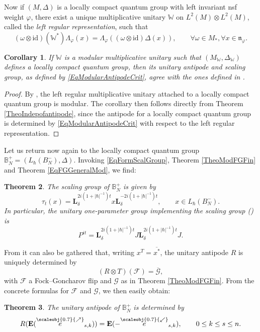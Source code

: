 \documentclass[11pt, reqno]{amsart}
\newtheorem{theorem}{Theorem}[section]
\newtheorem{cor}[theorem]{Corollary}
\theoremstyle{definition}
\numberwithin{equation}{section}
\newcommand{\Fct}{\mathcal{F}}
\newcommand{\tFct}{\mathcal{G}}
\newcommand{\Bor}{B}
\newcommand{\nears}{\scaleobj{0.7}{\nearrow}}
\newcommand{\swars}{\scaleobj{0.7}{\swarrow}}
\newcommand{\nee}{\overset{\nears}{e}}
\newcommand{\swe}{\overset{\swars}{e}}
\newcommand{\id}{\mathrm{id}}
\newcommand{\Eb}{\mathbf{E}}
\newcommand{\Lb}{\mathbf{L}}
\newcommand{\Wbb}{\mathbb{W}}
\newcommand{\mfn}{\mathfrak{n}}
\newcommand{\Bbbb}{\mathbb{B}}
\begin{document}
Now if $(M,\Delta)$ is a locally compact quantum group with left invariant nsf weight $\varphi$, there exist a unique multiplicative unitary $\Wbb$ on $L^2(M)\otimes L^2(M)$, called the \emph{left regular representation}, such that 
\begin{equation}\label{EqLeftRegularMultUnit}
(\omega\otimes \id)(\Wbb^*)\Lambda_{\varphi}(x) = \Lambda_{\varphi}((\omega\otimes \id)\Delta(x)),\qquad \forall \omega \in M_*,\forall x\in \mfn_{\varphi}. 
\end{equation}

\begin{cor}
If $\Wbb$ is a modular multiplicative unitary such that $(M_{\Wbb},\Delta_{\Wbb})$ defines a locally compact quantum group, then its unitary antipode and scaling group, as defined by \eqref{EqModularAntipodeCrit}, agree with the ones defined in \cite{KV03}. 
\end{cor}
\begin{proof}
By \cite[Proposition 6.10]{KV00}, the left regular multiplicative unitary attached to a locally compact quantum group is modular. The corollary then follows directly from Theorem \ref{TheoIndepofantipode}, since the antipode for a locally compact quantum group is determined by \eqref{EqModularAntipodeCrit} with respect to the left regular representation.
\end{proof}

Let us return now again to the locally compact quantum group $\Bbbb_N^+ = (L_{\hbar}(\Bor_N^-),\Delta)$. Invoking \eqref{EqFormScalGroup}, Theorem \ref{TheoModFGFin} and Theorem \ref{EqFGGeneralMod}, we find: 
\begin{theorem} \label{TheoScalGroup}
The scaling group of $\Bbbb_N^+$ is given by 
\begin{equation}
\tau_t(x) = \Lb_{\delta}^{2i(1+|\hbar|^{-1})t}x \Lb_{\delta}^{-2i(1+|\hbar|^{-1})t} ,\qquad x\in L_{\hbar}(\Bor_N^-).
\end{equation}
In particular, the unitary one-parameter group implementing the scaling group (\cite[Definition 6.9]{KV00}) is 
\begin{equation}
P^{it} = \Lb_{\delta}^{2i(1+|\hbar|^{-1})t} J \Lb_{\delta}^{2i(1+|\hbar|^{-1})t} J.
\end{equation}
\end{theorem}

From \cite[Theorem 2.3]{SW01} it can also be gathered that, writing $x^T = \overline{x^*}$, the unitary antipode $R$ is uniquely determined by  
\begin{equation}
(R\otimes T)(\Fct) = \overline{\tFct}, 
\end{equation}
with $\Fct$ a Fock--Goncharov flip and $\tFct$ as in Theorem \ref{TheoModFGFin}. From the concrete formulas for $\Fct$ and $\tFct$, we then easily obtain:
\begin{theorem}
The unitary antipode of $\Bbbb_N^+$ is determined by 
\begin{equation}\label{EqFormUnitAntip}
R(\Eb(\nee_{s,k})) = \Eb(-\swe_{s,k}),\qquad 0\leq k \leq s \leq n.
\end{equation}
\end{theorem}
\end{document}
